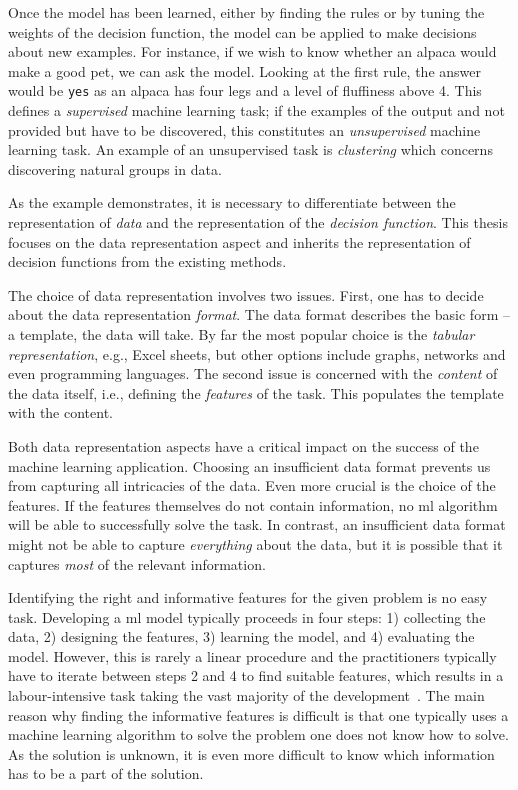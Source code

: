 Once the model has been learned, either by finding the rules or by tuning the weights of the decision function, the model can be applied to make decisions about new examples.
For instance, if we wish to know whether an alpaca would make a good pet, we can ask the model.
Looking at the first rule, the answer would be \texttt{yes} as an alpaca has four legs and a level of fluffiness above 4.
This defines a \textit{supervised} machine learning task; if the examples of the output and not provided but have to be discovered, this constitutes an \textit{unsupervised} machine learning task.
An example of an unsupervised task is \textit{clustering} which concerns discovering natural groups in data.



As the example demonstrates, it is necessary to differentiate between the representation of \textit{data} and the representation of  the \textit{decision function}.
This thesis focuses on the data representation aspect and inherits the representation of decision functions from the existing methods.





The choice of data representation involves two issues.
First, one has to decide about the data representation \textit{format}.
The data format describes the basic form -- a template, the data will take.
By far the most popular choice is the \textit{tabular representation}, e.g., Excel sheets, but other options include graphs, networks and even programming languages.
The second issue is concerned with the \textit{content} of the data itself, i.e., defining the \textit{features} of the task.
This populates the template with the content.



Both data representation aspects have a critical impact on the success of the machine learning application.
Choosing an insufficient data format prevents us from capturing all intricacies of the data.
Even more crucial is the choice of the features.
If the features themselves do not contain information, no \gls{ml} algorithm will be able to successfully solve the task.
In contrast, an insufficient data format might not be able to capture \textit{everything} about the data, but it is possible that it captures \textit{most} of the relevant information.



Identifying the right and informative features for the given problem is no easy task.
Developing a \gls{ml} model typically proceeds in four steps: 1) collecting the data, 2) designing the features, 3) learning the model, and 4) evaluating the model.
However, this is rarely a linear procedure and the practitioners typically have to iterate between steps 2 and 4 to find suitable features, which  results in a labour-intensive task taking the vast majority of the development~\cite{Wirth00crisp-dm:towards}.
The main reason why finding the informative features is difficult is that one typically uses a machine learning algorithm to solve the problem one does not know how to solve.
As the solution is unknown, it is even more difficult to know which information has to be a part of the solution.



